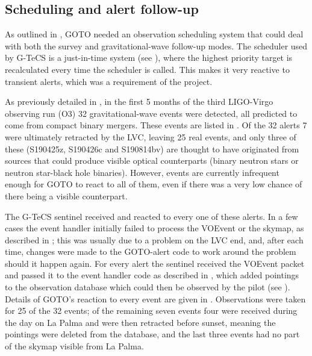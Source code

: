 \subsection{Scheduling and alert follow-up}
\label{sec:gw_results}
\begin{colsection}

As outlined in , GOTO needed an observation scheduling system that could deal with both the survey and gravitational-wave follow-up modes. The scheduler used by G-TeCS is a just-in-time system (see ), where the highest priority target is recalculated every time the scheduler is called. This makes it very reactive to transient alerts, which was a requirement of the project.

As previously detailed in , in the first 5 months of the third LIGO-Virgo observing run (O3) 32 gravitational-wave events were detected, all predicted to come from compact binary mergers. These events are listed in . Of the 32 alerts 7 were ultimately retracted by the LVC, leaving 25 real events, and only three of these (S190425z, S190426c and S190814bv) are thought to have originated from sources that could produce visible optical counterparts (binary neutron stars or neutron star-black hole binaries). However, events are currently infrequent enough for GOTO to react to all of them, even if there was a very low chance of there being a visible counterpart.

The G-TeCS sentinel received and reacted to every one of these alerts. In a few cases the event handler initially failed to process the VOEvent or the skymap, as described in ; this was usually due to a problem on the LVC end, and, after each time, changes were made to the GOTO-alert code to work around the problem should it happen again. For every alert the sentinel received the VOEvent packet and passed it to the event handler code as described in , which added pointings to the observation database which could then be observed by the pilot (see ). Details of GOTO's reaction to every event are given in . Observations were taken for 25 of the 32 events; of the remaining seven events four were received during the day on La Palma and were then retracted before sunset, meaning the pointings were deleted from the database, and the last three events had no part of the skymap visible from La Palma.


\newpage


\end{colsection}
